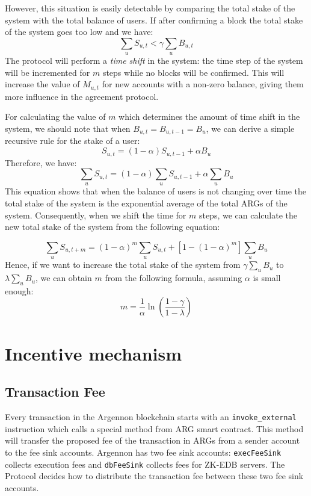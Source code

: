 \documentclass[11pt, a4paper]{report}
\begin{document}
    However, this situation is easily detectable by comparing the total stake of the system with the total balance of
    users. If after confirming a block the total stake of the system goes too low and we have:
    \[
        \sum_{u}S_{u,t} < \gamma \sum_{u}B_{u,t}
    \]
    The protocol will perform a \emph{time shift} in the system: the time step of the system
    will be incremented for \(m\) steps while no blocks will be confirmed. This will increase the value of \(M_{u,t}\)
    for new accounts with a non-zero balance, giving them more influence in the agreement protocol.

    For calculating the value of \(m\) which determines the amount of time shift in the system, we should note that when
    \(B_{u,t} = B_{u, t-1} = B_u\), we can derive a simple recursive rule for the stake of a user:
    \[
        S_{u,t} = (1 - \alpha) S_{u,t-1} + \alpha B_u
    \]
    Therefore, we have:
    \[
        \sum_{u}S_{u,t} = (1 - \alpha) \sum_{u}S_{u,t - 1} + \alpha \sum_{u}B_u
    \]
    This equation shows that when the balance of users is not changing over time the total stake of the system is the
    exponential average of the total ARGs of the system. Consequently, when we shift the time for \(m\) steps, we can
    calculate the new total stake of the system from the following equation:

    \[
        \sum_{u}S_{u,t+m} = (1 - \alpha)^{m}\sum_{u}S_{u,t} + [1 - (1 - \alpha)^{m}]\sum_{u}B_u
    \]
    Hence, if we want to increase the total stake of the system from \(\gamma \sum_{u}B_u\) to \(\lambda \sum_{u}B_u\),
    we can obtain \(m\) from the following formula, assuming \(\alpha\) is small enough:
    \[
        m = \frac{1}{\alpha} \ln \left(\frac{1 - \gamma}{1 - \lambda}\right)
    \]


    \section{Incentive mechanism}\label{sec:incentive-mechanism}

    \subsection{Transaction Fee}\label{subsec:transaction-fee}

    Every transaction in the Argennon blockchain starts with an \texttt{invoke\_external} instruction which calls a
    special method from ARG smart contract. This method will transfer the proposed fee of the transaction in ARGs
    from a sender account to the fee sink accounts. Argennon has two fee sink accounts: \texttt{execFeeSink} collects
    execution fees and \texttt{dbFeeSink} collects fees for ZK-EDB servers. The Protocol decides how to distribute the
    transaction fee between these two fee sink accounts.
\end{document}
